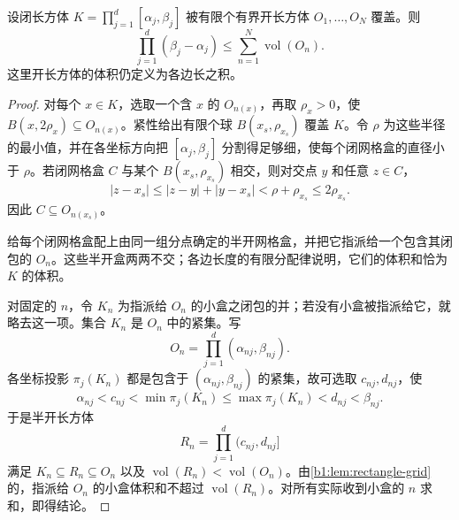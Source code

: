 \begin{lemma}
\label{b1:lem:compact-rectangle-cover}
设闭长方体 \(K=\prod_{j=1}^d[\alpha_j,\beta_j]\) 被有限个有界开长方体 \(O_1,\ldots,O_N\) 覆盖。则
\[
\prod_{j=1}^{d}(\beta_j-\alpha_j)
\leq\sum_{n=1}^{N}\operatorname{vol}(O_n).
\]
这里开长方体的体积仍定义为各边长之积。
\end{lemma}
\begin{proof}
对每个 \(x\in K\)，选取一个含 \(x\) 的 \(O_{n(x)}\)，再取 \(\rho_x>0\)，使 \(B(x,2\rho_x)\subseteq O_{n(x)}\)。紧性给出有限个球 \(B(x_s,\rho_{x_s})\) 覆盖 \(K\)。令 \(\rho\) 为这些半径的最小值，并在各坐标方向把 \([\alpha_j,\beta_j]\) 分割得足够细，使每个闭网格盒的直径小于 \(\rho\)。若闭网格盒 \(C\) 与某个 \(B(x_s,\rho_{x_s})\) 相交，则对交点 \(y\) 和任意 \(z\in C\)，
\[
\lvert z-x_s\rvert
\leq \lvert z-y\rvert+\lvert y-x_s\rvert
<\rho+\rho_{x_s}\leq2\rho_{x_s}.
\]
因此 \(C\subseteq O_{n(x_s)}\)。

给每个闭网格盒配上由同一组分点确定的半开网格盒，并把它指派给一个包含其闭包的 \(O_n\)。这些半开盒两两不交；各边长度的有限分配律说明，它们的体积和恰为 \(K\) 的体积。

对固定的 \(n\)，令 \(K_n\) 为指派给 \(O_n\) 的小盒之闭包的并；若没有小盒被指派给它，就略去这一项。集合 \(K_n\) 是 \(O_n\) 中的紧集。写
\[
O_n=\prod_{j=1}^{d}(\alpha_{nj},\beta_{nj}).
\]
各坐标投影 \(\pi_j(K_n)\) 都是包含于 \((\alpha_{nj},\beta_{nj})\) 的紧集，故可选取 \(c_{nj},d_{nj}\)，使
\[
\alpha_{nj}<c_{nj}<\min\pi_j(K_n)
\leq\max\pi_j(K_n)<d_{nj}<\beta_{nj}.
\]
于是半开长方体
\[
R_n=\prod_{j=1}^{d}(c_{nj},d_{nj}]
\]
满足 \(K_n\subseteq R_n\subseteq O_n\) 以及
\(\operatorname{vol}(R_n)<\operatorname{vol}(O_n)\)。由\cref{b1:lem:rectangle-grid}的，指派给 \(O_n\) 的小盒体积和不超过 \(\operatorname{vol}(R_n)\)。对所有实际收到小盒的 \(n\) 求和，即得结论。
\end{proof}

